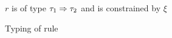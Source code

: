 
\begin{figure}[h]
{$r$ is of type $\trulnp{\tau_1}{\tau_2}$ and is constrained by $\xi$}

\begin{mathpar}
\end{mathpar}
\caption{Typing of rule}
\label{fig:ruletyp}
\end{figure}
